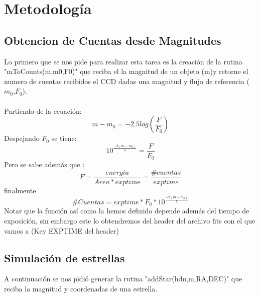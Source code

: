 \documentclass[twocolumn]{AS4201}
\begin{document}
\section{Metodología} 
\subsection{Obtencion de Cuentas desde Magnitudes}
\label{cuentas}
Lo primero que se nos pide para realizar esta tarea es la creación de la rutina "mToCounts(m,m0,F0)" que reciba el la magnitud de un objeto (m)y retorne el numero de cuentas recibidos el CCD dadas una magnitud y flujo de referencia ($m_0$,$F_0$).\\
\\
Partiendo de la ecuación:
\begin{equation}
	m-m_0=-2.5log(\frac{F}{F_0})
\end{equation}
Despejando $F_0$ se tiene:
\begin{equation}
	10^{\frac{-2(m-m_0)}{5}}=\frac{F}{F_0}
\end{equation}
Pero se sabe además que :
\begin{equation}
	F=\frac{energia}{Area*exptime}=\frac{\# cuentas}{exptime}
\end{equation}
finalmente 
\begin{equation}
	\# Cuentas=exptime*F_0*10^{\frac{-2(m-m_0)}{5}}
\end{equation}
Notar que la función así como la hemos definido depende además del tiempo de exposición, sin embargo este lo obtendremos del header del archivo fits con el que vamos a (Key EXPTIME del header)  
\subsection{Simulación de estrellas}
A continuación se nos pidió generar la rutina "addStar(hdu,m,RA,DEC)" que reciba la magnitud y coordenadas de una estrella.\\ 	
\end{document}
